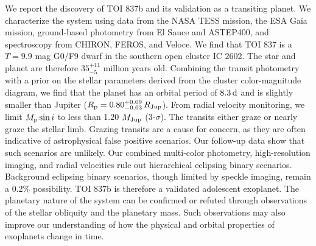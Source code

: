 We report the discovery of TOI 837b and its validation as a transiting planet.  We characterize the system using data from the NASA TESS mission, the ESA Gaia mission, ground-based photometry from El Sauce and ASTEP400, and spectroscopy from CHIRON, FEROS, and Veloce.  We find that TOI 837 is a $T=9.9$ mag G0/F9 dwarf in the southern open cluster IC 2602.  The star and planet are therefore $35^{+11}_{-5}$ million years old.  Combining the transit photometry with a prior on the stellar parameters derived from the cluster color-magnitude diagram, we find that the planet has an orbital period of $8.3\,{\rm d}$ and is slightly smaller than Jupiter ($R_{\rm p} = 0.80^{+0.09}_{-0.03} \,R_{\rm Jup}$).  From radial velocity monitoring, we limit $M_{\rm p}\sin i$ to less than 1.20 $M_{\rm Jup}$ (3-$\sigma$).  The transits either graze or nearly graze the stellar limb.  Grazing transits are a cause for concern, as they are often indicative of astrophysical false positive scenarios.  Our follow-up data show that such scenarios are unlikely.  Our combined multi-color photometry, high-resolution imaging, and radial velocities rule out hierarchical eclipsing binary scenarios.  Background eclipsing binary scenarios, though limited by speckle imaging, remain a 0.2\% possibility.  TOI 837b is therefore a validated adolescent exoplanet.  The planetary nature of the system can be confirmed or refuted through observations of the stellar obliquity and the planetary mass.  Such observations may also improve our understanding of how the physical and orbital properties of exoplanets change in time.
